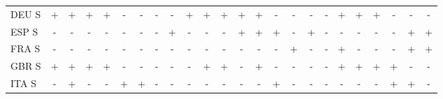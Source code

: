 \documentclass[12pt,bibliography=totoc]{article}
\begin{document}
\begin{appendices}
\begin{table}[H]
\begin{tabular}{l  cccccccc@{\hskip 0.2in}  cccccccc@{\hskip 0.2in}   ccccccc}
DEU S	&\cellcolor{green!25}+	&\cellcolor{green!25}+	&\cellcolor{green!25}+	&\cellcolor{green!25}+	&\cellcolor{red!25}-	&\cellcolor{red!25}-	&\cellcolor{red!25}-	&\cellcolor{red!25}-	&\cellcolor{green!25}+	&\cellcolor{green!25}+	&\cellcolor{green!25}+	&\cellcolor{green!25}+	&\cellcolor{green!25}+	&\cellcolor{red!25}-	&\cellcolor{red!25}-	&\cellcolor{red!25}-	&\cellcolor{red!25}-	&\cellcolor{green!25}+	&\cellcolor{green!25}+	&\cellcolor{green!25}+	&\cellcolor{red!25}-	&\cellcolor{red!25}-	&\cellcolor{red!25}-\\
ESP S	&\cellcolor{red!25}-	&\cellcolor{red!25}-	&\cellcolor{red!25}-	&\cellcolor{red!25}-	&\cellcolor{red!25}-	&\cellcolor{red!25}-	&\cellcolor{red!25}-	&\cellcolor{green!25}+	&\cellcolor{red!25}-	&\cellcolor{red!25}-	&\cellcolor{red!25}-	&\cellcolor{green!25}+	&\cellcolor{green!25}+	&\cellcolor{green!25}+	&\cellcolor{red!25}-	&\cellcolor{green!25}+	&\cellcolor{red!25}-	&\cellcolor{red!25}-	&\cellcolor{red!25}-	&\cellcolor{red!25}-	&\cellcolor{red!25}-	&\cellcolor{green!25}+	&\cellcolor{green!25}+\\
FRA S	&\cellcolor{red!25}-	&\cellcolor{red!25}-	&\cellcolor{red!25}-	&\cellcolor{red!25}-	&\cellcolor{red!25}-	&\cellcolor{red!25}-	&\cellcolor{red!25}-	&\cellcolor{red!25}-	&\cellcolor{red!25}-	&\cellcolor{red!25}-	&\cellcolor{red!25}-	&\cellcolor{red!25}-	&\cellcolor{red!25}-	&\cellcolor{red!25}-	&\cellcolor{green!25}+	&\cellcolor{red!25}-	&\cellcolor{red!25}-	&\cellcolor{green!25}+	&\cellcolor{red!25}-	&\cellcolor{red!25}-	&\cellcolor{red!25}-	&\cellcolor{green!25}+	&\cellcolor{green!25}+\\
GBR S	&\cellcolor{green!25}+	&\cellcolor{green!25}+	&\cellcolor{green!25}+	&\cellcolor{green!25}+	&\cellcolor{red!25}-	&\cellcolor{red!25}-	&\cellcolor{red!25}-	&\cellcolor{red!25}-	&\cellcolor{red!25}-	&\cellcolor{green!25}+	&\cellcolor{green!25}+	&\cellcolor{red!25}-	&\cellcolor{green!25}+	&\cellcolor{red!25}-	&\cellcolor{red!25}-	&\cellcolor{red!25}-	&\cellcolor{red!25}-	&\cellcolor{green!25}+	&\cellcolor{green!25}+	&\cellcolor{green!25}+	&\cellcolor{green!25}+	&\cellcolor{red!25}-	&\cellcolor{red!25}-\\
ITA S	&\cellcolor{red!25}-	&\cellcolor{green!25}+	&\cellcolor{red!25}-	&\cellcolor{red!25}-	&\cellcolor{green!25}+	&\cellcolor{green!25}+	&\cellcolor{red!25}-	&\cellcolor{red!25}-	&\cellcolor{red!25}-	&\cellcolor{red!25}-	&\cellcolor{red!25}-	&\cellcolor{red!25}-	&\cellcolor{red!25}-	&\cellcolor{green!25}+	&\cellcolor{red!25}-	&\cellcolor{red!25}-	&\cellcolor{red!25}-	&\cellcolor{red!25}-	&\cellcolor{red!25}-	&\cellcolor{red!25}-	&\cellcolor{green!25}+	&\cellcolor{green!25}+	&\cellcolor{red!25}-\\

\end{tabular}
\end{table}
\end{appendices}
\end{document}
